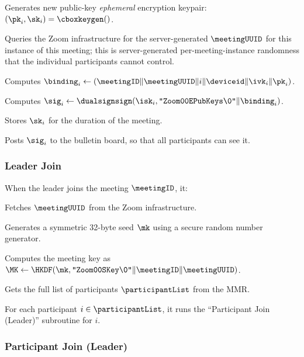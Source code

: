 \begingroup
\RaggedRight
\begin{enumerate*}
\item Generates new public-key \textit{ephemeral} encryption keypair: $(\pk_i, \sk_i) = \cboxkeygen()$.
\item Queries the Zoom infrastructure for the server-generated $\meetingUUID$ for this instance of this meeting; this is server-generated per-meeting-instance randomness that the individual participants cannot control.
\item Computes $\binding_i \leftarrow \left( \meetingID \| \allowbreak \meetingUUID \| i \allowbreak \| \deviceid \| \ivk_i \| \allowbreak \pk_i \right)$.
\item Computes $\sig_i \leftarrow \dualsignsign(\isk_i, \texttt{"Zoom00EPubKeys\textbackslash0"} \| \allowbreak \binding_i)$.
\item Stores $\sk_i$ for the duration of the meeting.
\item Posts $\sig_i$ to the bulletin board, so that all participants can see it.
\end{enumerate*}
\endgroup

\subsubsection{Leader Join}

When the leader joins the meeting $\meetingID$, it:

\begingroup
\RaggedRight
\begin{enumerate*}
\item Fetches $\meetingUUID$ from the Zoom infrastructure.
\item Generates a symmetric 32-byte seed $\mk$ using a secure random number generator.
\item Computes the meeting key as $\MK \leftarrow \HKDF(\mk, \allowbreak \texttt{"Zoom00SKey\textbackslash0"} \|  \allowbreak \meetingID \|  \allowbreak \meetingUUID)$.
\item Gets the full list of participants $\participantList$ from the MMR.
\item For each participant $i \in \participantList$, it runs the ``Participant Join (Leader)'' subroutine for $i$.
\end{enumerate*}
\endgroup

\subsubsection{Participant Join (Leader)}

